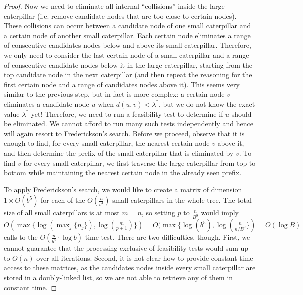 \documentclass[11pt,a4paper]{article}
\theoremstyle{definition}
\theoremstyle{remark}
\begin{document}
\begin{proof}
Now we need to eliminate all internal ``collisions'' inside the large caterpillar (i.e. remove candidate nodes that
are too close to certain nodes). These collisions can occur between a candidate node of one small caterpillar
and a certain node of another small caterpillar. Each certain node eliminates a range of consecutive
candidates nodes below and above its small caterpillar. Therefore, we only need to consider the 
last certain node of a small caterpillar and a range of consecutive candidate nodes below it in the
large caterpillar, starting from the top candidate node in the next caterpillar (and then repeat
the reasoning for the first certain node and a range of candidates nodes above it). This seems very similar
to the previous step, but in fact is more complex: a certain node $v$ eliminates a candidate node $u$ when
$d(u,v)<\lambda^{*}$, but we do not know the exact value $\lambda^{*}$ yet! Therefore, we need to run
a feasibility test to determine if $u$ should be eliminated. We cannot afford to run many such tests
independently and hence will again resort to Frederickson's search. Before we proceed, observe that
it is enough to find, for every small caterpillar, the nearest certain node $v$ above it, and then determine
the prefix of the small caterpillar that is eliminated by $v$. To find $v$ for every small caterpillar,
we first traverse the large caterpillar from top to bottom while maintaining the nearest certain node
in the already seen prefix.

To apply Frederickson's search, we would like to create a matrix of dimension $1\times O(b^{5})$
for each of the $O(\frac{n}{b^{4}})$ small caterpillars in the whole tree. The total size of all small
caterpillars is at most $m=n$, so setting $p$ to $\frac{n}{B^9}$ would imply
$O(\max \lbrace \log(\max_{j} \lbrace n_j \rbrace), \log(\frac{m}{p+1}) \rbrace) = O(\max \lbrace \log (b^{5}), \log(\frac{n}{n/B^{9}} \rbrace) = O(\log B)$ calls to the $O(\frac{n}{b^{4}} \cdot \log b)$ time test.
There are two difficulties, though. First, we cannot guarantee that the processing exclusive of feasibility tests
would sum up to $O(n)$ over all iterations. Second, it is not clear how to provide constant time access
to these matrices, as the candidates nodes inside every small caterpillar are stored in a doubly-linked list,
so we are not able to retrieve any of them in constant time. 


\end{proof}
\end{document}
